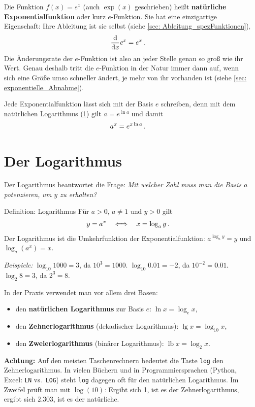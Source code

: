 Die Funktion $f(x) = e^x$ (auch $\exp(x)$ geschrieben) heißt \textbf{natürliche Exponentialfunktion} oder kurz $e$-Funktion. Sie hat eine einzigartige Eigenschaft: Ihre Ableitung ist sie selbst (siehe \cref{sec: Ableitung_spezFunktionen}),
\begin{equation}
    \frac{\mathrm{d}}{\mathrm{d} x} e^x = e^x \,.
\end{equation}
Die Änderungsrate der $e$-Funktion ist also an jeder Stelle genau so groß wie ihr Wert. Genau deshalb tritt die $e$-Funktion in der Natur immer dann auf, wenn sich eine Größe umso schneller ändert, je mehr von ihr vorhanden ist (siehe \cref{sec: exponentielle_Abnahme}).

Jede Exponentialfunktion lässt sich mit der Basis $e$ schreiben, denn mit dem natürlichen Logarithmus (\cref{sec: Logarithmus}) gilt $a = e^{\ln a}$ und damit
\begin{equation}\label{eq: ax_als_ex}
    a^x = e^{x \ln a} \,.
\end{equation}

\section{Der Logarithmus}\label{sec: Logarithmus}
Der Logarithmus beantwortet die Frage: \textit{Mit welcher Zahl muss man die Basis $a$ potenzieren, um $y$ zu erhalten?}
\begin{rememberbox}[]{Definition: Logarithmus}
    Für $a > 0$, $a \neq 1$ und $y > 0$ gilt
    \begin{equation}\label{eq: def_logarithmus}
        y = a^x \quad \Longleftrightarrow \quad x = \log_a y \,.
    \end{equation}
    Der Logarithmus ist die Umkehrfunktion der Exponentialfunktion: $a^{\log_a y} = y$ und $\log_a\left(a^x\right) = x$.
\end{rememberbox}
\textit{Beispiele:} $\log_{10} 1000 = 3$, da $10^3 = 1000$. \quad $\log_{10} \num{0.01} = -2$, da $10^{-2} = \num{0.01}$. \quad $\log_2 8 = 3$, da $2^3 = 8$.

In der Praxis verwendet man vor allem drei Basen:
\begin{itemize}[itemsep=1.5pt]
    \item den \textbf{natürlichen Logarithmus} zur Basis $e$: $\ln x = \log_e x$,
    \item den \textbf{Zehnerlogarithmus} (dekadischer Logarithmus): $\lg x = \log_{10} x$,
    \item den \textbf{Zweierlogarithmus} (binärer Logarithmus): $\operatorname{lb} x = \log_2 x$.
\end{itemize}
\textbf{Achtung:} Auf den meisten Taschenrechnern bedeutet die Taste \texttt{log} den Zehnerlogarithmus. In vielen Büchern und in Programmiersprachen (\zB Python, Excel: \texttt{LN} vs.\ \texttt{LOG}) steht \texttt{log} dagegen oft für den natürlichen Logarithmus. Im Zweifel prüft man mit $\log(10)$: Ergibt sich 1, ist es der Zehnerlogarithmus, ergibt sich $\num{2.303}$, ist es der natürliche.

